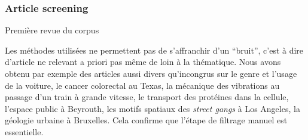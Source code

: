 

\subsubsection{Article screening}{Première revue du corpus}

Les méthodes utilisées ne permettent pas de s'affranchir d'un ``bruit'', c'est à dire d'article ne relevant a priori pas même de loin à la thématique. Nous avons obtenu par exemple des articles aussi divers qu'incongrus sur le genre et l'usage de la voiture, le cancer colorectal au Texas, la mécanique des vibrations au passage d'un train à grande vitesse, le transport des protéines dans la cellule, l'espace public à Beyrouth, les motifs spatiaux des \emph{street gangs} à Los Angeles, la géologie urbaine à Bruxelles. Cela confirme que l'étape de filtrage manuel est essentielle.

